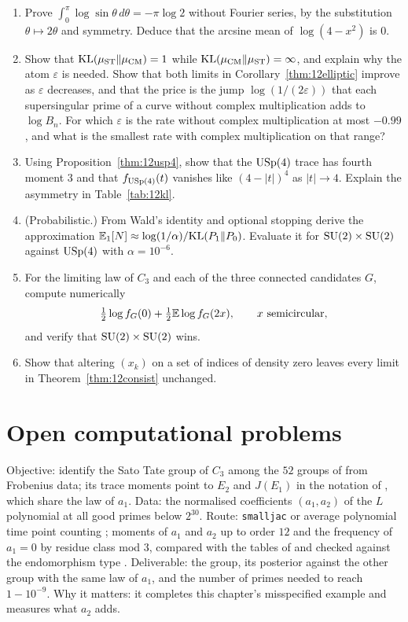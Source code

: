 \begin{enumerate}
\item Prove $\int_0^\pi\log\sin\theta\,d\theta=-\pi\log2$ without Fourier series, by the substitution $\theta\mapsto2\theta$ and symmetry. Deduce that the arcsine mean of $\log(4-x^2)$ is $0$.
\item Show that $\mathrm{KL}(\mu_{\mathrm{ST}}\|\mu_{\mathrm{CM}})=1$ while $\mathrm{KL}(\mu_{\mathrm{CM}}\|\mu_{\mathrm{ST}})=\infty$, and explain why the atom $\varepsilon$ is needed. Show that both limits in Corollary~\ref{thm:12elliptic} improve as $\varepsilon$ decreases, and that the price is the jump $\log(1/(2\varepsilon))$ that each supersingular prime of a curve without complex multiplication adds to $\log B_n$. For which $\varepsilon$ is the rate without complex multiplication at most $-0.99$, and what is the smallest rate with complex multiplication on that range?
\item Using Proposition~\ref{thm:12usp4}, show that the $\mathrm{USp}(4)$ trace has fourth moment $3$ and that $f_{\mathrm{USp}(4)}(t)$ vanishes like $(4-|t|)^{4}$ as $|t|\to4$. Explain the asymmetry in Table~\ref{tab:12kl}.
\item (Probabilistic.) From Wald's identity and optional stopping derive the approximation $\mathbb{E}_1[N]\approx\log(1/\alpha)/\mathrm{KL}(P_1\|P_0)$. Evaluate it for $\mathrm{SU}(2)\times\mathrm{SU}(2)$ against $\mathrm{USp}(4)$ with $\alpha=10^{-6}$.
\item For the limiting law of $C_3$ and each of the three connected candidates $G$, compute numerically
\[
\tfrac12\log f_G(0)+\tfrac12\mathbb{E}\log f_G(2x),\qquad x\text{ semicircular},
\]
and verify that $\mathrm{SU}(2)\times\mathrm{SU}(2)$ wins.
\item Show that altering $(x_k)$ on a set of indices of density zero leaves every limit in Theorem~\ref{thm:12consist} unchanged.
\end{enumerate}

\section{Open computational problems}

\begin{compproblem}[The group of $y^2=x^6+x^3+1$]
Objective: identify the Sato Tate group of $C_3$ among the $52$ groups of \cite{fkrs2012} from Frobenius data; its trace moments point to $E_2$ and $J(E_1)$ in the notation of \cite{fkrs2012}, which share the law of $a_1$. Data: the normalised coefficients $(a_1,a_2)$ of the $L$ polynomial at all good primes below $2^{30}$. Route: \texttt{smalljac} or average polynomial time point counting \cite{harveysutherland2014}; moments of $a_1$ and $a_2$ up to order $12$ and the frequency of $a_1=0$ by residue class mod $3$, compared with the tables of \cite{fkrs2012} and checked against the endomorphism type \cite{cmsv2019}. Deliverable: the group, its posterior against the other group with the same law of $a_1$, and the number of primes needed to reach $1-10^{-9}$. Why it matters: it completes this chapter's misspecified example and measures what $a_2$ adds.
\end{compproblem}


